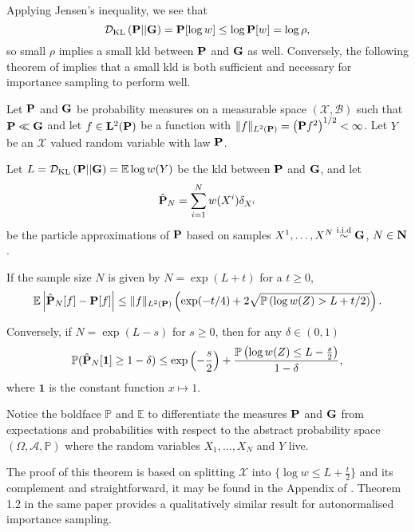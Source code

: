 Applying Jensen's inequality, we see that
$$
\Dkl{\P}{\G} = \P [\log w] \leq \log \P[w] = \log\rho,
$$
so small $\rho$ implies a small \acrshort{kld} between $\P$ and $\G$ as well. Conversely, the following theorem of \citeauthor{Chatterjee2018Sample} implies that a small \acrshort{kld} is both sufficient and necessary for importance sampling to perform well.
\begin{theorem}
    \label{thm:chatterje2018Thm1}
     Let $\P$ and $\G$ be probability measures on a measurable space $(\mathcal X, \mathcal B)$ such that $\P \ll \G$ and let $f \in \mathbf L^2(\P)$ be a function with $\lVert f \rVert_{L^{2}(\P)} = \left( \P f^{2} \right)^{1 / 2} < 
     \infty$. Let $Y$ be an $\mathcal X$ valued random variable with law $\P$. 
     
     Let $L = \Dkl{\P}{\G} = \mathbb E \log w(Y)$ be the \acrshort{kld} between $\P$ and $\G$, and let $$\hat \P_N = \sum_{i = 1}^N w(X^i) \delta_{X^i}$$ be the particle approximations of $\P$  based on samples $X^1, \dots, X^N\iid \G$, $N \in \N$. 
     
     If the sample size $N$ is given by $N = \exp\left( L + t \right)$ for a $t \geq 0$,
     \begin{align} \label{eq:chatterje-upper-bound}\mathbb E \left\lvert \hat \P_N[f] - \P [f] \right\rvert \leq \lVert f \rVert_{L^2(\P)} \left(\exp(-t / 4) + 2 \sqrt{\mathbb P \left( \log w(Z) > L + t / 2 \right)}\right). \end{align}

    Conversely, if $N = \exp \left( L - s \right)$ for $s \geq 0$, then for any $\delta \in (0,1)$ 
    \begin{align}
        \label{eq:chatterje-lower-bound}
    \mathbb P (\hat \P_{N}[ \mathbf 1 ] \geq 1 - \delta) \leq \exp \left( -\frac{s}{2} \right) + \frac{\mathbb P \left( \log w(Z) \leq L -\frac{s}{2} \right)}{ 1- \delta},
    \end{align}
    where $\mathbf 1$ is the constant function $x \mapsto 1$.

     Notice the boldface $\mathbb P$ and $\mathbb E$ to differentiate the measures $\P$ and $\G$ from expectations and probabilities with respect to the abstract probability space $\left( \Omega, \mathcal A, \mathbb P \right)$ where the random variables $X_{1}, \dots, X_{N}$ and $Y$ live.
\end{theorem}

The proof of this theorem is based on splitting $\mathcal X$ into $\{\log w \leq L + \frac{t}{2}\} $ and its complement and straightforward, it may be found in the Appendix of \citep{Chatterjee2018Sample}. Theorem 1.2 in the same paper provides a qualitatively similar result for autonormalised importance sampling.

